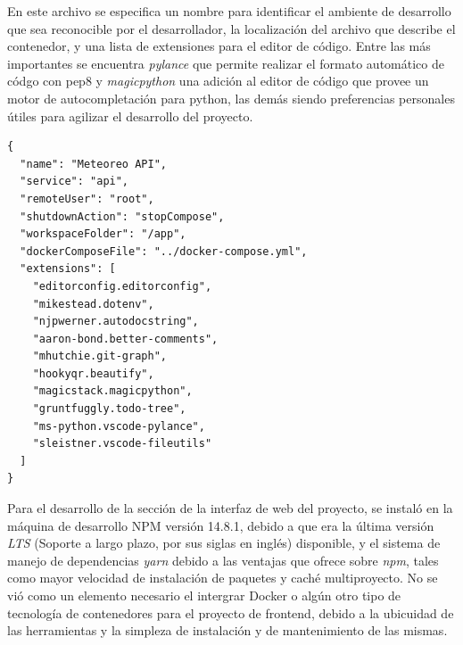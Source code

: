 En este archivo se especifica un nombre para identificar el ambiente de desarrollo que sea reconocible por el desarrollador, la localización del archivo que describe el contenedor, y una lista de extensiones para el editor de código. Entre las más importantes se encuentra \emph{pylance} que permite  realizar el formato automático de códgo con pep8 y \emph{magicpython} una adición al editor de código que provee un motor de autocompletación para python, las demás siendo preferencias personales útiles para agilizar el desarrollo del proyecto.


\begin{verbatim}
{
  "name": "Meteoreo API",
  "service": "api",
  "remoteUser": "root",
  "shutdownAction": "stopCompose",
  "workspaceFolder": "/app",
  "dockerComposeFile": "../docker-compose.yml",
  "extensions": [
    "editorconfig.editorconfig",
    "mikestead.dotenv",
    "njpwerner.autodocstring",
    "aaron-bond.better-comments",
    "mhutchie.git-graph",
    "hookyqr.beautify",
    "magicstack.magicpython",
    "gruntfuggly.todo-tree",
    "ms-python.vscode-pylance",
    "sleistner.vscode-fileutils"
  ]
}
\end{verbatim}

Para el desarrollo de la sección de la interfaz de web del proyecto, se instaló en la máquina de desarrollo NPM versión 14.8.1, debido a que era la última versión \textit{LTS} (Soporte a largo plazo, por sus siglas en inglés) disponible, y el sistema de manejo de dependencias \textit{yarn} debido a las ventajas que ofrece sobre \textit{npm}, tales como mayor velocidad de instalación de paquetes y caché multiproyecto. No se vió como un elemento necesario el intergrar Docker o algún otro tipo de tecnología de contenedores para el proyecto de frontend, debido a la ubicuidad de las herramientas y la simpleza de instalación y de mantenimiento de las mismas.
